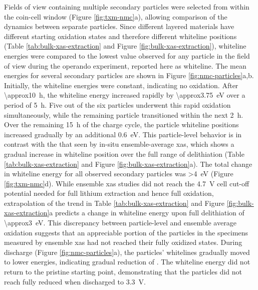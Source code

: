 \documentclass{article}
\begin{document}

Fields of view containing multiple secondary particles were selected
from within the coin-cell window (Figure \ref{fig:txm-nmc}a), allowing
comparison of the dynamics between separate particles. Since different
layered materials have different starting  oxidation states and
therefore different whiteline positions (Table
\ref{tab:bulk-xas-extraction} and Figure
\ref{fig:bulk-xas-extraction}), whiteline energies were compared to
the lowest value observed for any particle in the field of view during
the operando experiment, reported here as \textDelta{}whiteline. The
mean energies for several \nmc[333]{} secondary particles are shown in
Figure \ref{fig:nmc-particles}a,b. Initially, the whiteline energies
were constant, indicating no  oxidation. After
\SI{\approx10}{\hour}, the whiteline energy increased rapidly by
\SI{\approx3.75}{eV} over a period of \SI{5}{\hour}. Five out of the
six particles underwent this rapid oxidation simultaneously, while the
remaining particle transitioned within the next \SI{2}{\hour}. Over
the remaining \SI{15}{\hour} of the charge cycle, the particle
whiteline positions increased gradually by an additional
\SI{0.6}{eV}. This particle-level behavior is in contrast with the
that seen by in-situ ensemble-average \gls{xas}\cite{deb2005}, which
shows a gradual increase in whiteline position over the full range of
delithiation (Table \ref{tab:bulk-xas-extraction} and Figure
\ref{fig:bulk-xas-extraction}a). The total change in whiteline energy
for all observed secondary particles was \SI{>4}{eV} (Figure
\ref{fig:txm-nmc}d). While ensemble \gls{xas}
studies\cite{deb2005,muto2009} did not reach the \SI{4.7}{V} cell
cut-off potential needed for full lithium extraction and hence full
 oxidation, extrapolation of the trend in Table
\ref{tab:bulk-xas-extraction} and Figure
\ref{fig:bulk-xas-extraction}a predicts a change in whiteline energy
upon full delithiation of \SI{\approx3}{eV}. This discrepancy between
particle-level and ensemble average  oxidation suggests that an
appreciable portion of the particles in the specimens measured by
ensemble \gls{xas} had not reached their fully oxidized states. During
discharge (Figure \ref{fig:nmc-particles}a), the particles' whitelines
gradually moved to lower energies, indicating gradual reduction of
. The whiteline energy did not return to the pristine starting
point, demonstrating that the particles did not reach fully reduced
 when discharged to \SI{3.3}{V}.
\end{document}
